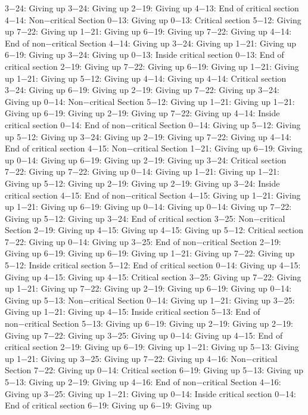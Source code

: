 3−24: Giving up
3−24: Giving up
2−19: Giving up
4−13: End of critical section
4−14: Non−critical Section
0−13: Giving up
0−13: Critical section
5−12: Giving up
7−22: Giving up
1−21: Giving up
6−19: Giving up
7−22: Giving up
4−14: End of non−critical Section
4−14: Giving up
3−24: Giving up
1−21: Giving up
6−19: Giving up
3−24: Giving up
0−13: Inside critical section
0−13: End of critical section
2−19: Giving up
7−22: Giving up
6−19: Giving up
1−21: Giving up
1−21: Giving up
5−12: Giving up
4−14: Giving up
4−14: Critical section
3−24: Giving up
6−19: Giving up
2−19: Giving up
7−22: Giving up
3−24: Giving up
0−14: Non−critical Section
5−12: Giving up
1−21: Giving up
1−21: Giving up
6−19: Giving up
2−19: Giving up
7−22: Giving up
4−14: Inside critical section
0−14: End of non−critical Section
0−14: Giving up
5−12: Giving up
5−12: Giving up
3−24: Giving up
2−19: Giving up
7−22: Giving up
4−14: End of critical section
4−15: Non−critical Section
1−21: Giving up
6−19: Giving up
0−14: Giving up
6−19: Giving up
2−19: Giving up
3−24: Critical section
7−22: Giving up
7−22: Giving up
0−14: Giving up
1−21: Giving up
1−21: Giving up
5−12: Giving up
2−19: Giving up
2−19: Giving up
3−24: Inside critical section
4−15: End of non−critical Section
4−15: Giving up
1−21: Giving up
1−21: Giving up
6−19: Giving up
0−14: Giving up
0−14: Giving up
7−22: Giving up
5−12: Giving up
3−24: End of critical section
3−25: Non−critical Section
2−19: Giving up
4−15: Giving up
4−15: Giving up
5−12: Critical section
7−22: Giving up
0−14: Giving up
3−25: End of non−critical Section
2−19: Giving up
6−19: Giving up
6−19: Giving up
1−21: Giving up
7−22: Giving up
5−12: Inside critical section
5−12: End of critical section
0−14: Giving up
4−15: Giving up
4−15: Giving up
4−15: Critical section
3−25: Giving up
7−22: Giving up
1−21: Giving up
7−22: Giving up
2−19: Giving up
6−19: Giving up
0−14: Giving up
5−13: Non−critical Section
0−14: Giving up
1−21: Giving up
3−25: Giving up
1−21: Giving up
4−15: Inside critical section
5−13: End of non−critical Section
5−13: Giving up
6−19: Giving up
2−19: Giving up
2−19: Giving up
7−22: Giving up
3−25: Giving up
0−14: Giving up
4−15: End of critical section
2−19: Giving up
6−19: Giving up
1−21: Giving up
5−13: Giving up
1−21: Giving up
3−25: Giving up
7−22: Giving up
4−16: Non−critical Section
7−22: Giving up
0−14: Critical section
6−19: Giving up
5−13: Giving up
5−13: Giving up
2−19: Giving up
4−16: End of non−critical Section
4−16: Giving up
3−25: Giving up
1−21: Giving up
0−14: Inside critical section
0−14: End of critical section
6−19: Giving up
6−19: Giving up
